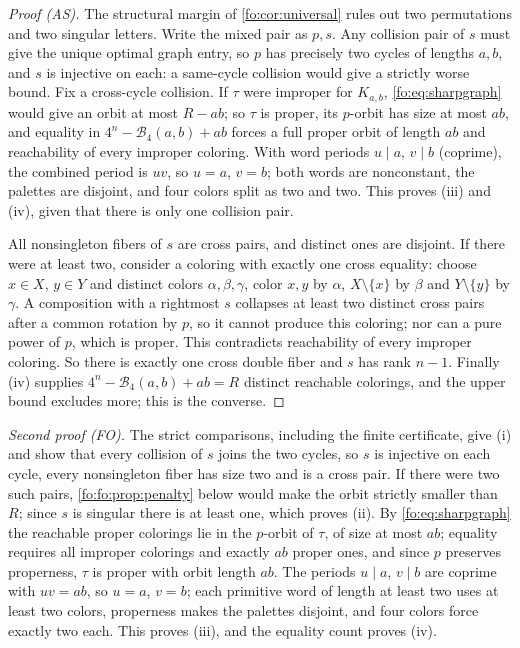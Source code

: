 \documentclass[11pt,a4paper]{article}
\numberwithin{equation}{section}
\theoremstyle{definition}
\theoremstyle{remark}
\newcommand{\Bip}{\mathcal B}
\begin{document}
\begin{proof}[Proof (AS)]
The structural margin of \cref{fo:cor:universal} rules out two permutations
and two singular letters. Write the mixed pair as $p,s$. Any collision pair of
$s$ must give the unique optimal graph entry, so $p$ has precisely two cycles
of lengths $a,b$, and $s$ is injective on each: a same-cycle collision would
give a strictly worse bound. Fix a cross-cycle collision. If $\tau$ were
improper for $K_{a,b}$, \eqref{fo:eq:sharpgraph} would give an orbit at most
$R-ab$; so $\tau$ is proper, its $p$-orbit has size at most $ab$, and equality
in $4^n-\Bip_4(a,b)+ab$ forces a full proper orbit of length $ab$ and
reachability of every improper coloring. With word periods $u\mid a$, $v\mid b$
(coprime), the combined period is $uv$, so $u=a$, $v=b$; both words are
nonconstant, the palettes are disjoint, and four colors split as two and two.
This proves (iii) and (iv), given that there is only one collision pair.

All nonsingleton fibers of $s$ are cross pairs, and distinct ones are
disjoint. If there were at least two, consider a coloring with exactly one
cross equality: choose $x\in X$, $y\in Y$ and distinct colors
$\alpha,\beta,\gamma$, color $x,y$ by $\alpha$, $X\setminus\{x\}$ by $\beta$ and
$Y\setminus\{y\}$ by $\gamma$. A composition with a rightmost $s$ collapses
at least two distinct cross pairs after a common rotation by $p$, so it cannot
produce this coloring; nor can a pure power of $p$, which is proper. This
contradicts reachability of every improper coloring. So there is exactly one
cross double fiber and $s$ has rank $n-1$. Finally (iv) supplies
$4^n-\Bip_4(a,b)+ab=R$ distinct reachable colorings, and the upper bound
excludes more; this is the converse.
\end{proof}

\noindent\emph{Second proof (FO).} The strict comparisons, including the
finite certificate, give (i) and show that every collision of $s$ joins the
two cycles, so $s$ is injective on each cycle, every nonsingleton fiber has
size two and is a cross pair. If there were two such pairs,
\cref{fo:fo:prop:penalty} below would make the orbit strictly smaller than
$R$; since $s$ is singular there is at least one, which proves (ii). By
\eqref{fo:eq:sharpgraph} the reachable proper colorings lie in the $p$-orbit
of $\tau$, of size at most $ab$; equality requires all improper colorings and
exactly $ab$ proper ones, and since $p$ preserves properness, $\tau$ is proper
with orbit length $ab$. The periods $u\mid a$, $v\mid b$ are coprime with
$uv=ab$, so $u=a$, $v=b$; each primitive word of length at least two uses at
least two colors, properness makes the palettes disjoint, and four colors
force exactly two each. This proves (iii), and the equality count proves (iv).
\end{document}
